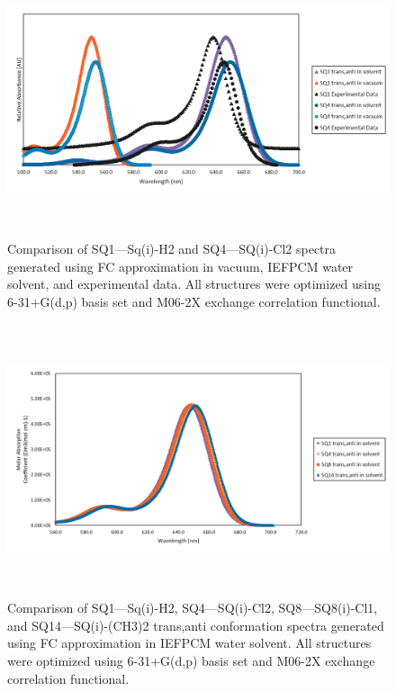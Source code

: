 \documentclass[journal=jacsat,manuscript=article]{achemso}
\begin{document}
\begin{figure}[h]
    \centering
    \includegraphics[width=15cm,height=8cm]{figures/sq1-sq4.png}
    \caption{Comparison of  SQ1—Sq(i)-H2 and SQ4—SQ(i)-Cl2 spectra generated using FC approximation in vacuum, IEFPCM water solvent, and experimental data. All structures were optimized using 6-31+G(d,p) basis set and M06-2X exchange correlation functional.}
    \label{fig:SQ1 and SQ4}
\end{figure}
\newpage

\newpage
\newpage
\begin{figure}[h]
    \centering
    \includegraphics[width=15cm,height=8cm]{figures/sq1_4_8_14.png}
    \caption{Comparison of  SQ1—Sq(i)-H2, SQ4—SQ(i)-Cl2, SQ8—SQ8(i)-Cl1, and SQ14—SQ(i)-(CH3)2 trans,anti conformation spectra generated using FC approximation in IEFPCM water solvent. All structures were optimized  using 6-31+G(d,p) basis set and M06-2X exchange correlation functional.}
    \label{tab:SQ1,4,8,14 absorption}
\end{figure}
\end{document}
